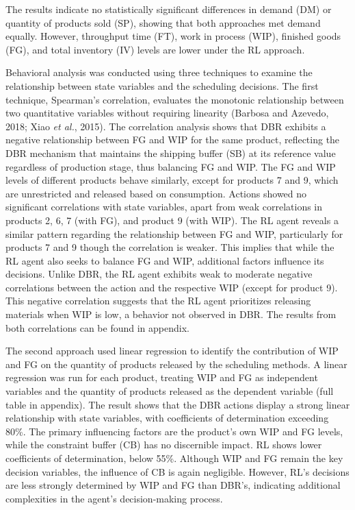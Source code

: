 The results indicate no statistically significant differences in demand
(DM) or quantity of products sold (SP), showing that both approaches met
demand equally. However, throughput time (FT), work in process (WIP),
finished goods (FG), and total inventory (IV) levels are lower under the
RL approach.

Behavioral analysis was conducted using three techniques to examine the
relationship between state variables and the scheduling decisions. The
first technique, Spearman's correlation, evaluates the monotonic
relationship between two quantitative variables without requiring
linearity (Barbosa and Azevedo, 2018; Xiao \emph{et al.}, 2015). The
correlation analysis shows that DBR exhibits a negative relationship
between FG and WIP for the same product, reflecting the DBR mechanism
that maintains the shipping buffer (SB) at its reference value
regardless of production stage, thus balancing FG and WIP. The FG and
WIP levels of different products behave similarly, except for products 7
and 9, which are unrestricted and released based on consumption. Actions
showed no significant correlations with state variables, apart from weak
correlations in products 2, 6, 7 (with FG), and product 9 (with WIP).
The RL agent reveals a similar pattern regarding the relationship
between FG and WIP, particularly for products 7 and 9 though the
correlation is weaker. This implies that while the RL agent also seeks
to balance FG and WIP, additional factors influence its decisions.
Unlike DBR, the RL agent exhibits weak to moderate negative correlations
between the action and the respective WIP (except for product 9). This
negative correlation suggests that the RL agent prioritizes releasing
materials when WIP is low, a behavior not observed in DBR. The results
from both correlations can be found in appendix.

The second approach used linear regression to identify the contribution
of WIP and FG on the quantity of products released by the scheduling
methods. A linear regression was run for each product, treating WIP and
FG as independent variables and the quantity of products released as the
dependent variable (full table in appendix). The result shows that the
DBR actions display a strong linear relationship with state variables,
with coefficients of determination exceeding 80\%. The primary
influencing factors are the product's own WIP and FG levels, while the
constraint buffer (CB) has no discernible impact. RL shows lower
coefficients of determination, below 55\%. Although WIP and FG remain
the key decision variables, the influence of CB is again negligible.
However, RL's decisions are less strongly determined by WIP and FG than
DBR's, indicating additional complexities in the agent's decision-making
process.

